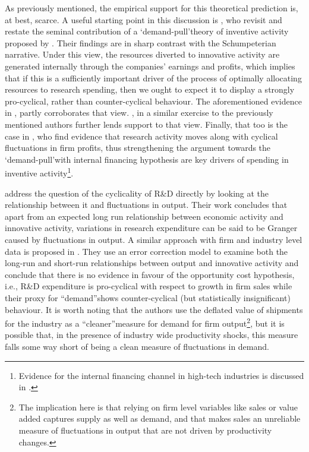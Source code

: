 \documentclass{_latex/house}
\begin{document}
As previously mentioned, the empirical support for this theoretical prediction is, at best, scarce. A useful starting point in this discussion is \cite{RePEc:eee:respol:v:19:y:1990:i:4:p:387-394}, who revisit and restate the seminal contribution of a \textquoteleft demand-pull\textquoteright\:theory of inventive activity proposed by \cite{2079533}. Their findings are in sharp contrast with the Schumpeterian narrative. Under this view, the resources diverted to innovative activity are generated internally through the companies' earnings and profits, which implies that if this is a sufficiently important driver of the process of optimally allocating resources to research spending, then we ought to expect it to display a strongly pro-cyclical, rather than counter-cyclical behaviour. The aforementioned evidence in \cite{RePEc:eee:respol:v:19:y:1990:i:4:p:387-394}, partly corroborates that view. \cite{1982}, in a similar exercise to the previously mentioned authors further lends support to that view. Finally, that too is the case in \cite{doi:10.1080/00036848400000012}, who find evidence that research activity moves along with cyclical fluctuations in firm profits, thus strengthening the argument towards the \textquoteleft demand-pull\textquoteright\:with internal financing hypothesis are key drivers of spending in inventive activity\footnote{Evidence for the internal financing channel in high-tech industries is discussed in \cite{1994}.}.

\cite{RePEc:ecj:econjl:v:105:y:1995:i:431:p:916-28} address the question of the cyclicality of R\&D directly by looking at the relationship between it and fluctuations in output. Their work concludes that apart from an expected long run relationship between economic activity and innovative activity, variations in research expenditure can be said to be Granger caused by fluctuations in output. A similar approach with firm and industry level data is proposed in \cite{doi:10.1080/0003684042000217959}. They use an error correction model to examine both the long-run and short-run relationships between output and innovative activity and conclude that there is no evidence in favour of the opportunity cost hypothesis, i.e., R\&D expenditure is pro-cyclical with respect to growth in firm sales while their proxy for \textquotedblleft demand\textquotedblright\:shows counter-cyclical (but statistically insignificant) behaviour. It is worth noting that the authors use the deflated value of shipments for the industry as a \textquotedblleft cleaner\textquotedblright\:measure for demand for firm output\footnote{The implication here is that relying on firm level variables like sales or value added captures supply as well as demand, and that makes sales an unreliable measure of fluctuations in output that are not driven by productivity changes.}, but it is possible that, in the presence of industry wide productivity shocks, this measure falls some way short of being a clean measure of fluctuations in demand.
\end{document}
